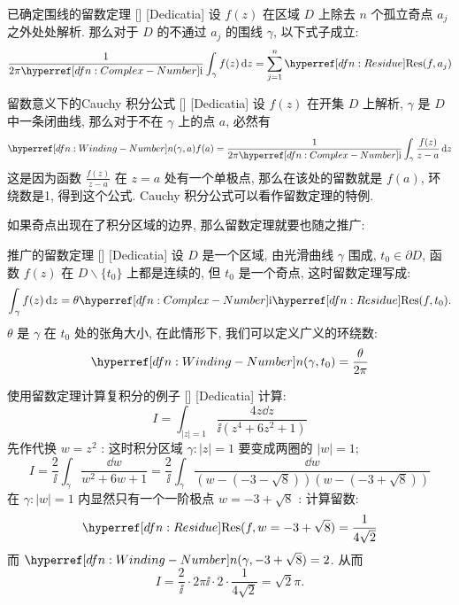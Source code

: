         \begin{crl}
            {已确定围线的留数定理}
            []
            [Dedicatia]
            设 \(f(z)\) 在区域 \(D\) 上除去 \(n\) 个孤立奇点 \(a_j\) 之外处处解析. 那么对于 \(D\) 的不通过 \(a_j\) 的围线 \(\gamma\), 以下式子成立: 
            \[\frac{1}{2\pi\ii}\int_\gamma f(z)\dd{z}=\sum_{j=1}^{n}\Res(f,a_j)\]
        \end{crl}
    
        \begin{crl}
            {留数意义下的Cauchy 积分公式}
            []
            [Dedicatia]
            设 \(f(z)\) 在开集 \(D\) 上解析,  \(\gamma\) 是 \(D\) 中一条闭曲线, 那么对于不在 \(\gamma\) 上的点 \(a\), 必然有
            \[\Windn(\gamma,a)f(a)=\frac{1}{2\pi\ii}\int_\gamma\frac{f(z)}{z-a}\dd{z} \]
            这是因为函数 \(\frac{f(z)}{z-a}\) 在 \(z=a\) 处有一个单极点, 那么在该处的留数就是 \(f(a)\), 环绕数是1, 得到这个公式. Cauchy 积分公式可以看作留数定理的特例.
        \end{crl}

    如果奇点出现在了积分区域的边界, 那么留数定理就要也随之推广: 

        \begin{thm}
            {推广的留数定理}
            []
            [Dedicatia]
            设 \(D\) 是一个区域, 由光滑曲线 \(\gamma\) 围成,  \(t_0\in\partial D\), 函数 \(f(z)\) 在 \(D\backslash\{t_0\}\) 上都是连续的, 但 \(t_0\) 是一个奇点, 这时留数定理写成: 
            \[\int_\gamma f(z)\dd{z}=\theta\ii\Res(f,t_0).\]
            \(\theta\) 是 \(\gamma\) 在 \(t_0\) 处的张角大小, 在此情形下, 我们可以定义广义的环绕数:
            \[\Windn(\gamma,t_0)=\frac{\theta}{2\pi}\]
        \end{thm}

        \begin{xmp}
            []
            {使用留数定理计算复积分的例子}
            []
            [Dedicatia]
            计算: 
            \[I=\int_{|z|=1}\frac{4z\dd{z}}{\ii(z^4+6z^2+1)}\]
            先作代换 \(w=z^2\) : 这时积分区域 \(\gamma:|z|=1\) 要变成两圈的 \(|w|=1\);
            \[I=\frac{2}{\ii}\int_{\gamma}\frac{\dd{w}}{w^2+6w+1}=\frac{2}{\ii}\int_{\gamma}\frac{\dd{w}}{(w-(-3-\sqrt{8}))(w-(-3+\sqrt{8}))}\]
            在 \(\gamma:|w|=1\) 内显然只有一个一阶极点 \(w=-3+\sqrt{8}\) : 计算留数: 
            \[\Res(f,w=-3+\sqrt{8})=\frac{1}{4\sqrt{2}}\]
            而 \(\Windn(\gamma,-3+\sqrt{8})=2\). 从而
            \[I=\frac{2}{\ii}\cdot 2\pi\ii\cdot 2\cdot\frac{1}{4\sqrt{2}}=\sqrt{2}\pi.\]
        \end{xmp}

